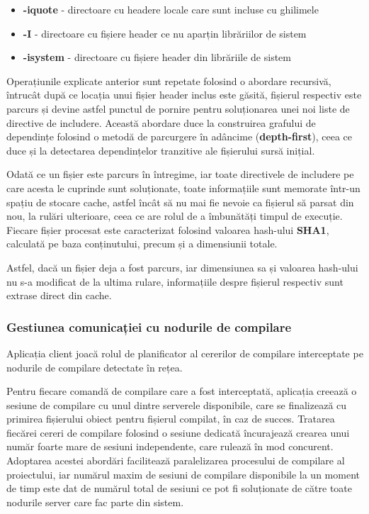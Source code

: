 \begin{itemize}
    \item \textbf{-iquote} - directoare cu headere locale care sunt incluse cu ghilimele
    \item \textbf{-I} - directoare cu fișiere header ce nu aparțin librăriilor de sistem
    \item \textbf{-isystem} - directoare cu fișiere header din librăriile de sistem
\end{itemize}

Operațiunile explicate anterior sunt repetate folosind o abordare recursivă, întrucât după ce locația unui fișier header inclus este găsită,
fișierul respectiv este parcurs și devine astfel punctul de pornire pentru soluționarea unei noi liste de directive de includere. Această abordare
duce la construirea grafului de dependințe folosind o metodă de parcurgere în adâncime (\textbf{depth-first}), ceea ce duce și la detectarea
dependințelor tranzitive ale fișierului sursă inițial.

Odată ce un fișier este parcurs în întregime, iar toate directivele de includere pe care acesta le cuprinde sunt soluționate, toate informațiile sunt
memorate într-un spațiu de stocare cache, astfel încât să nu mai fie nevoie ca fișierul să parsat din nou, la rulări ulterioare, ceea ce are rolul de
a îmbunătăți timpul de execuție. Fiecare fișier procesat este caracterizat folosind valoarea hash-ului \textbf{SHA1}\cite{eastlake2001us}, calculată pe baza conținutului,
precum și a dimensiunii totale.

Astfel, dacă un fișier deja a fost parcurs, iar dimensiunea sa și valoarea hash-ului nu s-a modificat de la ultima rulare, informațiile despre fișierul
respectiv sunt extrase direct din cache.

\subsubsection{Gestiunea comunicației cu nodurile de compilare}

Aplicația client joacă rolul de planificator al cererilor de compilare interceptate pe nodurile de
compilare detectate în rețea.

Pentru fiecare comandă de compilare care a fost interceptată, aplicația creează o sesiune de compilare cu unul dintre serverele disponibile, care se finalizează
cu primirea fișierului obiect pentru fișierul compilat, în caz de succes. Tratarea fiecărei cereri de compilare folosind o sesiune dedicată
încurajează crearea unui număr foarte mare de sesiuni independente, care rulează în mod concurent. Adoptarea acestei abordări facilitează paralelizarea 
procesului de compilare al proiectului, iar numărul maxim de sesiuni de compilare disponibile la un moment de timp este dat de numărul total de sesiuni ce pot
fi soluționate de către toate nodurile server care fac parte din sistem.

